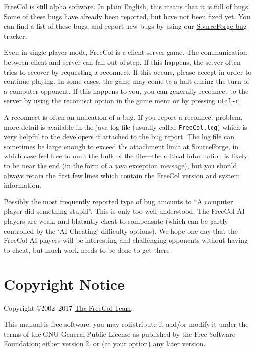 \documentclass[12pt]{book}
\begin{document}
FreeCol is still alpha software. In plain English, this means that it
is full of bugs. Some of these bugs have already been reported, but
have not been fixed yet. You can find a list of these bugs, and report
new bugs by using our
\href{http://sourceforge.net/tracker/?group_id=43225&atid=435578}{SourceForge
bug tracker}.

Even in single player mode, FreeCol is a client-server game. The
communication between client and server can fall out of step. If this
happens, the server often tries to recover by requesting a
reconnect. If this occurs, please accept in order to continue
playing. In some cases, the game may come to a halt during the turn of
a computer opponent. If this happens to you, you can generally
reconnect to the server by using the reconnect option in the
\hyperlink{game menu}{game menu} or by pressing \verb$ctrl-r$.

A reconnect is often an indication of a bug. If you report a
reconnect problem, more detail is available in the java log file
(usually called \texttt{FreeCol.log}) which is very helpful to the
developers if attached to the bug report. The log file can sometimes
be large enough to exceed the attachment limit at SourceForge, in
which case feel free to omit the bulk of the file---the critical
information is likely to be near the end (in the form of a
java exception message), but you should always retain the first few
lines which contain the FreeCol version and system information.

Possibly the most frequently reported type of bug amounts to ``A
computer player did something stupid''. This is only too well
understood. The FreeCol AI players are weak, and blatantly cheat to
compensate (which can be partly controlled by the `AI-Cheating'
difficulty options). We hope one day that the FreeCol AI players will
be interesting and challenging opponents without having to cheat,
but much work needs to be done to get there.

\hypertarget{Copyright Notice}{\chapter{Copyright Notice}}

Copyright \copyright 2002--2017
\href{http://freecol.sourceforge.net/index.php?section=8}{The FreeCol
Team}.

This manual is free software; you may redistribute it and/or modify it
under the terms of the GNU General Public License as published by the
Free Software Foundation; either version 2, or (at your option) any
later version.
\end{document}
